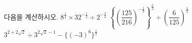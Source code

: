 다음을 계산하시오.
 $8^{\frac{1}{4}}\times 32^{-\frac{1}{2}}\div 2^{-\frac{3}{4}}$
 $\left\{\left(\dfrac{125}{216}\right)^{-\frac{1}{3}}\right\}^{\frac{5}{2}}\div\left(\dfrac{6}{125}\right)^{\frac{1}{2}}$
 $3^{2+2\sqrt{2}}\div 3^{2\sqrt{2}-1}-\{(-3)^{6}\}^{\frac{1}{2}}$
